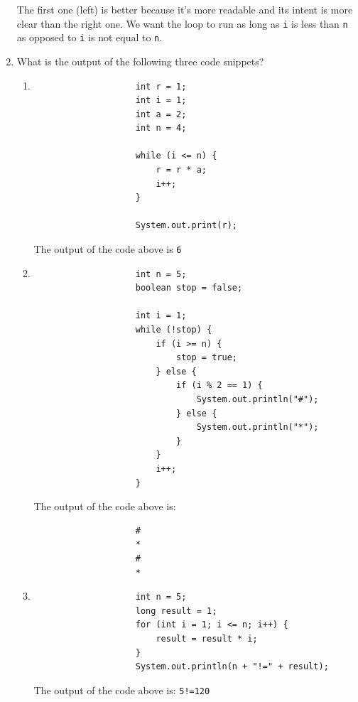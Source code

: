 \documentclass[12pt,titlepage]{article}
\begin{document}
\begin{enumerate}
{        The first one (left) is better because it's more readable and its intent is more clear than the right one.
        We want the loop to run as long as \texttt{i} is less than \texttt{n} as opposed to \texttt{i} is not equal to \texttt{n}.
    }
    \pagebreak
    \item {
        What is the output of the following three code snippets?

        \begin{enumerate}[label=\alph*.]
            \item {
                \begin{verbatim}
                    int r = 1;
                    int i = 1;
                    int a = 2;
                    int n = 4;
        
                    while (i <= n) {
                        r = r * a;
                        i++;
                    }
        
                    System.out.print(r);
                \end{verbatim}

                The output of the code above is \texttt{6}
            }
            \item {
                \begin{verbatim}
                    int n = 5;
                    boolean stop = false;
        
                    int i = 1;
                    while (!stop) {
                        if (i >= n) {
                            stop = true;
                        } else {
                            if (i % 2 == 1) {
                                System.out.println("#");
                            } else {
                                System.out.println("*");
                            }
                        }
                        i++;
                    }
                \end{verbatim}

                The output of the code above is:

                \begin{verbatim}
                    #
                    *
                    #
                    *
                \end{verbatim}
            }
            \item {
                \begin{verbatim}
                    int n = 5;
                    long result = 1;
                    for (int i = 1; i <= n; i++) {
                        result = result * i;
                    }
                    System.out.println(n + "!=" + result);
                \end{verbatim}

                The output of the code above is: \texttt{5!=120}
            }
        \end{enumerate}
    }
\end{enumerate}
\end{document}
